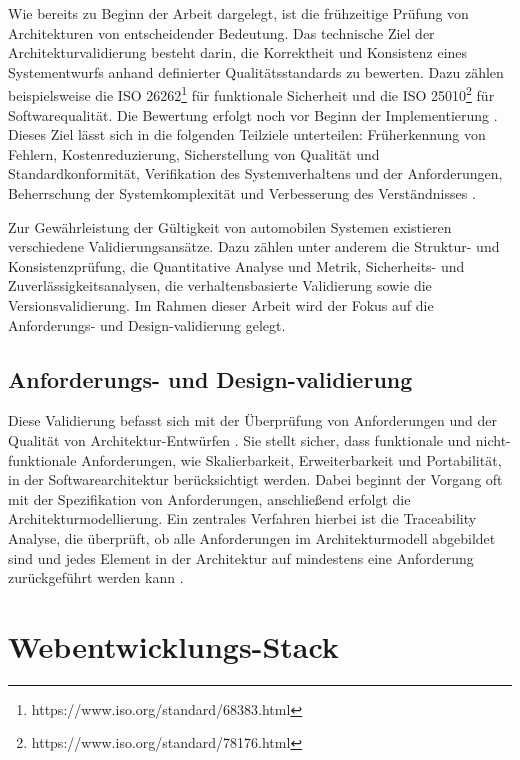 Wie bereits zu Beginn der Arbeit dargelegt, ist die frühzeitige Prüfung von Architekturen von entscheidender Bedeutung. Das technische Ziel der Architekturvalidierung besteht darin, die Korrektheit und Konsistenz eines Systementwurfs anhand definierter Qualitätsstandards zu bewerten. Dazu zählen beispielsweise die ISO 26262\footnote{https://www.iso.org/standard/68383.html} für funktionale Sicherheit und die ISO 25010\footnote{https://www.iso.org/standard/78176.html} für Softwarequalität. Die Bewertung erfolgt noch vor Beginn der Implementierung \cite{venkitachalam2015}. Dieses Ziel lässt sich in die folgenden Teilziele unterteilen: Früherkennung von Fehlern, Kostenreduzierung, Sicherstellung von Qualität und Standardkonformität, Verifikation des Systemverhaltens und der Anforderungen, Beherrschung der Systemkomplexität und Verbesserung des Verständnisses\cite{venkitachalam2015} \cite{Kan19} \cite{bucher2019crosslayera}.

Zur Gewährleistung der Gültigkeit von automobilen Systemen existieren verschiedene Validierungsansätze. Dazu zählen unter anderem die Struktur- und Konsistenzprüfung,  die Quantitative Analyse und Metrik, Sicherheits- und Zuverlässigkeitsanalysen, die verhaltensbasierte Validierung sowie die Versionsvalidierung. Im Rahmen dieser Arbeit wird der Fokus auf die Anforderungs- und Design-validierung gelegt.

\subsection*{Anforderungs- und Design-validierung}

Diese Validierung befasst sich mit der Überprüfung von Anforderungen und der Qualität von Architektur-Entwürfen \cite{ahrens2013objective}\cite{knieke2022managed}. Sie stellt sicher, dass funktionale und nicht-funktionale Anforderungen, wie Skalierbarkeit, Erweiterbarkeit und Portabilität, in der Softwarearchitektur berücksichtigt werden. Dabei beginnt der Vorgang oft mit der Spezifikation von Anforderungen, anschließend erfolgt die Architekturmodellierung. Ein zentrales Verfahren hierbei ist die Traceability Analyse, die überprüft, ob alle Anforderungen im Architekturmodell abgebildet sind und jedes Element in der Architektur auf mindestens eine Anforderung zurückgeführt werden kann \cite{vogel2021metrics}.

\section{Webentwicklungs-Stack}

